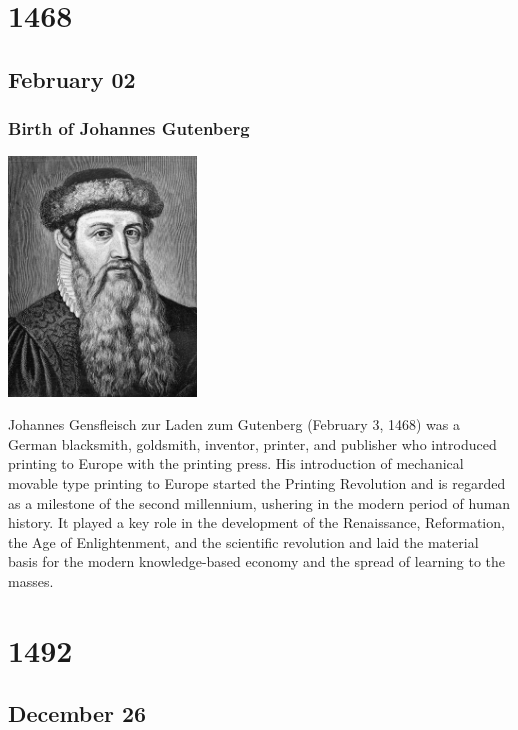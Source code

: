 \documentclass[11pt]{report}
\begin{document}
\chapter{1468}
\section{February 02}
\subsection{Birth of Johannes Gutenberg}
\vspace{2mm}\begin{center}\includegraphics[width=5cm]{./img/gutenberg.jpg}\end{center}
Johannes Gensfleisch zur Laden zum Gutenberg (February 3, 1468) was a German blacksmith, goldsmith, inventor, printer, and publisher who introduced printing to Europe with the printing press. His introduction of mechanical movable type printing to Europe started the Printing Revolution and is regarded as a milestone of the second millennium, ushering in the modern period of human history. It played a key role in the development of the Renaissance, Reformation, the Age of Enlightenment, and the scientific revolution and laid the material basis for the modern knowledge-based economy and the spread of learning to the masses.

\chapter{1492}
\section{December 26}
\end{document}
